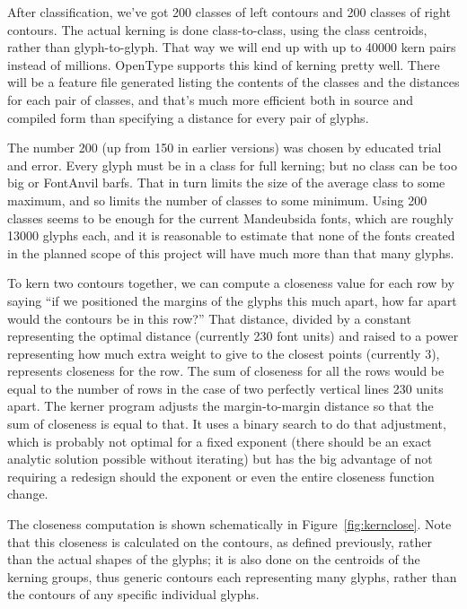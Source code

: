 \documentclass[14pt]{extarticle}
\begin{document}
After classification, we've got 200 classes of left contours and 200 classes
of right contours.  The actual kerning is done class-to-class, using the
class centroids, rather than glyph-to-glyph.  That way we will end up with
up to 40000 kern pairs instead of millions.  OpenType supports this kind of
kerning pretty well.  There will be a feature file generated listing the
contents of the classes and the distances for each pair of classes, and
that's much more efficient both in source and compiled form than specifying
a distance for every pair of glyphs.

The number 200 (up from 150 in earlier versions) was chosen by educated
trial and error.  Every glyph must be in a class for full kerning; but no
class can be too big or FontAnvil barfs.  That in turn limits the size of
the average class to some maximum, and so limits the number of classes to
some minimum.  Using 200 classes seems to be enough for the current
Mandeubsida fonts, which are roughly 13000 glyphs each, and it is reasonable
to estimate that none of the fonts created in the planned scope of this
project will have much more than that many glyphs.

To kern two contours together, we can compute a closeness value for each row
by saying ``if we positioned the margins of the glyphs this much apart, how
far apart would the contours be in this row?'' That distance, divided by a
constant representing the optimal distance (currently 230 font units) and
raised to a power representing how much extra weight to give to the closest
points (currently 3), represents closeness for the row.  The sum of
closeness for all the rows would be equal to the number of rows in the case
of two perfectly vertical lines 230 units apart.  The kerner program adjusts
the margin-to-margin distance so that the sum of closeness is equal to that. 
It uses a binary search to do that adjustment, which is probably not optimal
for a fixed exponent (there should be an exact analytic solution possible
without iterating) but has the big advantage of not requiring a redesign
should the exponent or even the entire closeness function change.

The closeness computation is shown schematically in
Figure~\ref{fig:kernclose}.  Note that this closeness is calculated on the
contours, as defined previously, rather than the actual shapes of the
glyphs; it is also done on the centroids of the kerning groups, thus generic
contours each representing many glyphs, rather than the contours of any
specific individual glyphs.
\end{document}
